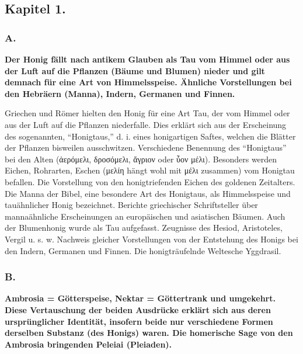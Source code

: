 \documentclass[a4paper, 11pt, oneside]{article}
\begin{document}
\subsection*{Kapitel 1.}

\subsubsection*{A.}

\textbf{Der Honig fällt nach antikem Glauben als Tau vom Himmel oder aus der Luft auf die Pflanzen (Bäume und Blumen) nieder und gilt demnach für eine Art von Himmelsspeise. Ähnliche Vorstellungen bei den Hebräern (Manna), Indern, Germanen und Finnen.}

Griechen und Römer hielten den Honig für eine Art Tau, der vom Himmel oder aus der Luft auf die Pflanzen niederfalle. Dies erklärt sich aus der Erscheinung des sogenannten, "`Honigtaus,"' d. i. eines honigartigen Saftes, welchen die Blätter der Pflanzen bisweilen ausschwitzen. Verschiedene Benennung des "`Honigtaus"' bei den Alten (ἀερόμελι, δροσόμελι, ἄγριον oder ὗον μέλι). Besonders werden Eichen, Rohrarten, Eschen (μελίη hängt wohl mit μέλι zusammen) vom Honigtau befallen. Die Vorstellung von den honigtriefenden Eichen des goldenen Zeitalters. Die Manna der Bibel, eine besondere Art des Honigtaus, als Himmelsspeise und tauähnlicher Honig bezeichnet. Berichte griechischer Schriftsteller über mannaähnliche Erscheinungen an europäischen und asiatischen Bäumen. Auch der Blumenhonig wurde als Tau aufgefasst. Zeugnisse des Hesiod, Aristoteles, Vergil u. s. w. Nachweis gleicher Vorstellungen von der Entstehung des Honigs bei den Indern, Germanen und Finnen. Die honigträufelnde Weltesche Yggdrasil.

\subsubsection*{B.}

\textbf{Ambrosia = Götterspeise, Nektar = Göttertrank und umgekehrt. Diese Vertauschung der beiden Ausdrücke erklärt sich aus deren ursprünglicher Identität, insofern beide nur verschiedene Formen derselben Substanz (des Honigs) waren. Die homerische Sage von den Ambrosia bringenden Peleiai (Pleiaden).}
\end{document}
